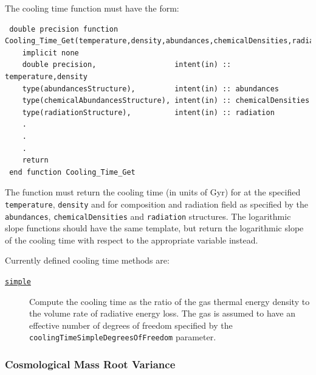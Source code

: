 The cooling time function must have the form:
\begin{verbatim}
 double precision function Cooling_Time_Get(temperature,density,abundances,chemicalDensities,radiation)
    implicit none
    double precision,                  intent(in) :: temperature,density
    type(abundancesStructure),         intent(in) :: abundances
    type(chemicalAbundancesStructure), intent(in) :: chemicalDensities
    type(radiationStructure),          intent(in) :: radiation
    .
    .
    .
    return
 end function Cooling_Time_Get
\end{verbatim}
The function must return the cooling time (in units of Gyr) for at the specified {\tt temperature}, {\tt density} and for composition and radiation field as specified by the {\tt abundances}, {\tt chemicalDensities} and {\tt radiation} structures. The logarithmic slope functions should have the same template, but return the logarithmic slope of the cooling time with respect to the appropriate variable instead.

Currently defined cooling time methods are:
\begin{description}
 \item [\hyperlink{cooling.cooling_time.simple.F90:cooling_times_simple:cooling_time_simple}{{\tt simple}}] Compute the cooling time as the ratio of the gas thermal energy density to the volume rate of radiative energy loss. The gas is assumed to have an effective number of degrees of freedom specified by the {\tt coolingTimeSimpleDegreesOfFreedom} parameter.
\end{description}

\subsubsection{Cosmological Mass Root Variance}

